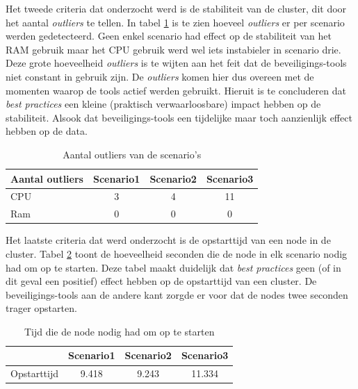 Het tweede criteria dat onderzocht werd is de stabiliteit van de cluster, dit door het aantal \textit{outliers} te tellen. In tabel \ref{tab:Outliers} is te zien hoeveel \textit{outliers} er per scenario werden gedetecteerd. Geen enkel scenario had effect op de stabiliteit van het RAM gebruik maar het CPU gebruik werd wel iets instabieler in scenario drie. Deze grote hoeveelheid \textit{outliers} is te wijten aan het feit dat de beveiligings-tools niet constant in gebruik zijn. De \textit{outliers} komen hier dus overeen met de momenten waarop de tools actief werden gebruikt. Hieruit is te concluderen dat \textit{best practices} een kleine (praktisch verwaarloosbare) impact hebben op de stabiliteit. Alsook dat beveiligings-tools een tijdelijke maar toch aanzienlijk effect hebben op de data.
%
\begin{table}[h]
	\centering
	\begin{tabular}{lccc}
		Aantal outliers & Scenario1 & Scenario2 & Scenario3 \\ \hline
		CPU             & 3         & 4         & 11        \\ \hline
		Ram             & 0         & 0         & 0        
	\end{tabular}
	\caption{Aantal outliers van de scenario's}
	\label{tab:Outliers}
\end{table}

Het laatste criteria dat werd onderzocht is de opstarttijd van een node in de cluster. Tabel \ref{tab:BootTime} toont de hoeveelheid seconden die de node in elk scenario nodig had om op te starten. Deze tabel maakt duidelijk dat \textit{best practices} geen (of in dit geval een positief) effect hebben op de opstarttijd van een cluster. De beveiligings-tools aan de andere kant zorgde er voor dat de nodes twee seconden trager opstarten. 

\begin{table}[h]
	\centering
	\begin{tabular}{lccc}
		& Scenario1 & Scenario2 & Scenario3 \\ \hline
		Opstarttijd & 9.418     & 9.243     & 11.334   
	\end{tabular}
	\caption{Tijd die de node nodig had om op te starten}
	\label{tab:BootTime}
\end{table}


